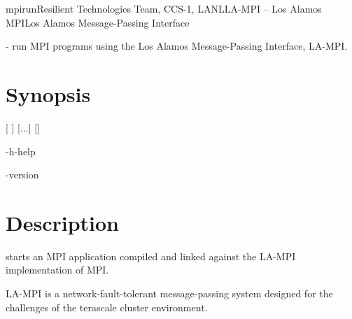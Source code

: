 \documentclass[english]{article}
\begin{document}
\begin{Name}{1}{mpirun}{Resilient Technologies Team, CCS-1, LANL}{LA-MPI -- Los Alamos MPI}{Los Alamos Message-Passing Interface}

   - run MPI programs using the Los Alamos Message-Passing Interface, LA-MPI.
\end{Name}

\section{Synopsis}

 [\Bar{} ] 
 [...]  []

 -h\Bar-help

 -version

\section{Description}
 starts an MPI application compiled and linked against the
LA-MPI implementation of MPI.

LA-MPI is a network-fault-tolerant message-passing system designed for
the challenges of the terascale cluster environment.
\end{document}
